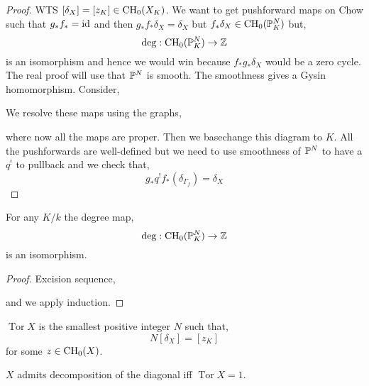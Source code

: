 \documentclass[12pt]{article}
\DeclareMathOperator{\torsion}{\mathrm{Tor}}
\begin{document}
\begin{proof}
WTS $[\delta_X] = [z_K] \in \CH_0(X_K)$. We want to get pushforward maps on Chow such that $g_* f_* = \id$ and then $g_* f_* \delta_X = \delta_X$ but $f_* \delta_X \in \CH_0(\P^N_K)$ but,
\[ \deg : \CH_0(\P^N_K) \to \Z \]
is an isomorphism and hence we would win because $f_* g_* \delta_X$ would be a zero cycle. 
\bigskip\\
The real proof will use that $\P^N$ is smooth. The smoothness gives a Gysin homomorphism. Consider,
\begin{center}
\end{center}
We resolve these maps using the graphs,
\begin{center}
\end{center}
where now all the maps are proper. Then we basechange this diagram to $K$. All the pushforwards are well-defined but we need to use smoothness of $\P^N$ to have a $q^!$ to pullback and we check that,
\[ g_* q^! f_* (\delta_{\Gamma_f}) = \delta_X \]
\end{proof}

\begin{lemma}
For any $K / k$ the degree map,
\[ \deg : \CH_0(\P^N_K) \to \Z \]
is an isomorphism.
\end{lemma}

\begin{proof}
Excision sequence,
\begin{center}
\end{center}
and we apply induction. 
\end{proof}

\begin{defn}
$\torsion{X}$ is the smallest positive integer $N$ such that,
\[ N [\delta_X] = [z_K] \]
for some $z \in \CH_0(X)$.
\end{defn}

\begin{cor}
$X$ admits decomposition of the diagonal iff $\torsion{X} = 1$.
\end{cor}
\end{document}
